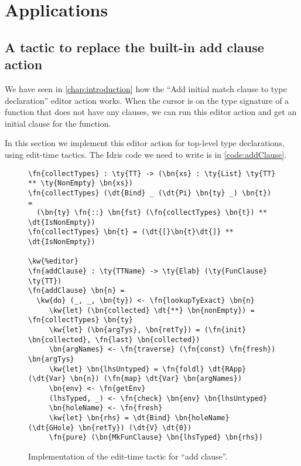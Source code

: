 \chapter{Applications} \label{chap:applications}

\section{A tactic to replace the built-in add clause action}\label{sec:addClause}

We have seen in \autoref{chap:introduction} how the ``Add initial match clause
to type declaration'' editor action works. When the cursor is on the type
signature of a function that does not have any clauses, we can run this editor
action and get an initial clause for the function.

In this section we implement this editor action for top-level type
declarations, using edit-time tactics. The Idris code we need to write is in
\autoref{code:addClause}.

\begin{figure}[ht]
\caption{Implementation of the edit-time tactic for ``add clause''.}
\label{code:addClause}
\begin{Verbatim}[framesep=2mm, label=\footnotesize{\normalfont{Idris}}, labelposition=topline]
\fn{collectTypes} : \ty{TT} -> (\bn{xs} : \ty{List} \ty{TT} ** \ty{NonEmpty} \bn{xs})
\fn{collectTypes} (\dt{Bind} _ (\dt{Pi} \bn{ty} _) \bn{t}) =
  (\bn{ty} \fn{::} \bn{fst} (\fn{collectTypes} \bn{t}) ** \dt{IsNonEmpty})
\fn{collectTypes} \bn{t} = (\dt{[}\bn{t}\dt{]} ** \dt{IsNonEmpty})

\kw{%editor}
\fn{addClause} : \ty{TTName} -> \ty{Elab} (\ty{FunClause} \ty{TT})
\fn{addClause} \bn{n} =
  \kw{do} (_, _, \bn{ty}) <- \fn{lookupTyExact} \bn{n}
     \kw{let} (\bn{collected} \dt{**} \bn{nonEmpty}) = \fn{collectTypes} \bn{ty}
     \kw{let} (\bn{argTys}, \bn{retTy}) = (\fn{init} \bn{collected}, \fn{last} \bn{collected})
     \bn{argNames} <- \fn{traverse} (\fn{const} \fn{fresh}) \bn{argTys}
     \kw{let} \bn{lhsUntyped} = \fn{foldl} \dt{RApp} (\dt{Var} \bn{n}) (\fn{map} \dt{Var} \bn{argNames})
     \bn{env} <- \fn{getEnv}
     (lhsTyped, _) <- \fn{check} \bn{env} \bn{lhsUntyped}
     \bn{holeName} <- \fn{fresh}
     \kw{let} \bn{rhs} = \dt{Bind} \bn{holeName} (\dt{GHole} \bn{retTy}) (\dt{V} \dt{0})
     \fn{pure} (\bn{MkFunClause} \bn{lhsTyped} \bn{rhs})
\end{Verbatim}
\end{figure}

